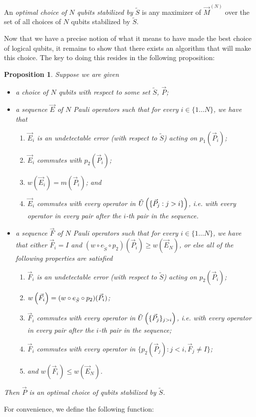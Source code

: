 \documentclass[twocolumn,showpacs,preprintnumbers,amsmath,amssymb,nofootinbib,pra,floatfix]{revtex4-1}
\newtheorem{proposition}{Proposition}
\newenvironment{definition}[1][Definition]{\begin{trivlist}
\item[\hskip \labelsep {\bfseries #1}]}{\end{trivlist}}
\newcommand{\lst}{\vec}
\newcommand{\set}{\tilde}
\begin{document}
\begin{definition}
An \emph{optimal choice of $N$ qubits stabilized by $\set S$} is any maximizer of $\lst M^{(N)}$ over the set of all choices of $N$ qubits stabilized by $\set S$.
\end{definition}
Now that we have a precise notion of what it means to have made the best choice of logical qubits, it remains to show that there exists an algorithm that will make this choice.  The key to doing this resides in the following proposition:

\begin{proposition}
\label{proposition-optimality-condition}
Suppose we are given
\begin{itemize}
\item a choice of $N$ qubits with respect to some set $\set S$, $\lst P$;
\item a sequence $\lst E$ of $N$ Pauli operators such that for every $i\in\{1\dots N\}$, we have that
\begin{enumerate}
\item $\lst E_i$ is an undetectable error (with respect to $\set S$) acting on $p_1(\lst P_i)$;
\item $\lst E_i$ commutes with $p_2(\lst P_i)$;
\item $w(\lst E_i)=m(\lst P_i)$; and
\item $\lst E_i$ commutes with every operator in $\set U\paren{\{\lst P_j:j>i\}}$, i.e. with every operator in every pair after the $i$-th pair in the sequence.
\end{enumerate}
\item a sequence $\lst F$ of $N$ Pauli operators such that for every $i\in\{1\dots N\}$, we have that either $\lst F_i=I$ and $(w \circ e_{\set S} \circ p_2)(\lst P_i) \ge w(\lst E_N)$, or else all of the following properties are satisfied
\begin{enumerate}
\item $\lst F_i$ is an undetectable error (with respect to $\set S$) acting on $p_2(\lst P_i)$;
\item $w\paren{\lst F_i}=(w\circ e_{\set S} \circ p_2)(\lst P_i)$;
\item $\lst F_i$ commutes with every operator in $\set U\paren{\{\lst P_j\}_{j > i}}$, i.e. with every operator in every pair after the $i$-th pair in the sequence;
\item $\lst F_i$ commutes with every operator in $\{p_2(\lst P_j): j<i, \lst F_j \ne I\}$;
\item and $w(\lst F_i)\le w(\lst E_N)$.
\end{enumerate}
\end{itemize}
Then $\lst P$ is an \emph{optimal choice of qubits stabilized by} $\set S$.
\end{proposition}
For convenience, we define the following function:
\end{document}

